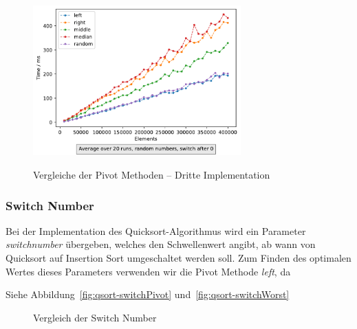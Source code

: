 \begin{figure}[hbt]
    \centering
    \caption{Vergleiche der Pivot Methoden -- Dritte Implementation}
    \includegraphics[width=8cm]
    {../out/pivotMethods.pdf}\label{fig:qsort-impl3-2}
\end{figure}

\FloatBarrier

\subsubsection{Switch Number}\label{subsubsec:switch-number}
Bei der Implementation des Quicksort-Algorithmus wird ein Parameter
\textit{switchnumber} übergeben, welches den Schwellenwert angibt, ab wann
von Quicksort auf Insertion Sort umgeschaltet werden soll.
Zum Finden des optimalen Wertes dieses Parameters verwenden wir die Pivot
Methode \textit{left}, da %

Siehe Abbildung~\ref{fig:qsort-switchPivot} und~\ref{fig:qsort-switchWorst}

\begin{figure}[hbt]
    \centering
    \caption{Vergleich der Switch Number}
\end{figure}


